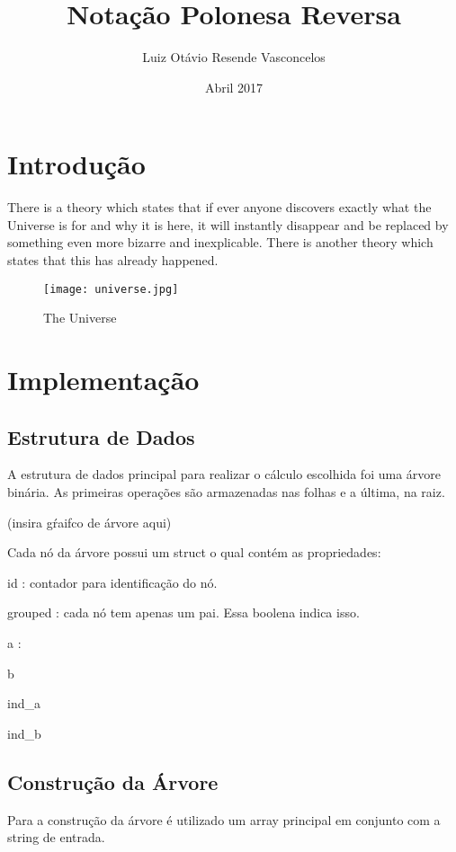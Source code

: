 \documentclass{article}
\title{Notação Polonesa Reversa}
\author{Luiz Otávio Resende Vasconcelos}
\date{Abril 2017}
\begin{document}
\maketitle

\section{Introdução}
There is a theory which states that if ever anyone discovers exactly what the Universe is for and why it is here, it will instantly disappear and be replaced by something even more bizarre and inexplicable.
There is another theory which states that this has already happened.

\begin{figure}[h!]
\centering
\texttt{[image: universe.jpg]}
\caption{The Universe}
\label{fig:univerise}
\end{figure}

\section{Implementação}
\subsection{Estrutura de Dados}
A estrutura de dados principal para realizar o cálculo escolhida foi uma árvore binária.
As primeiras operações são armazenadas nas folhas e a última, na raiz.


(insira gŕaifco de árvore aqui)


Cada nó da árvore possui um struct o qual contém as propriedades:

id          : contador para identificação do nó.

grouped     : cada nó tem apenas um pai. Essa boolena indica isso.

a           : 

b

ind_a

ind_b


\subsection{Construção da Árvore}
Para a construção da árvore é utilizado um array principal em conjunto com a string de entrada.
\end{document}
